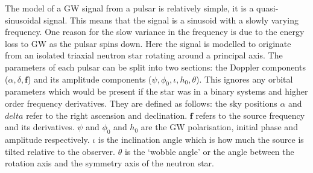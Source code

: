The model of a \gls{GW} signal from a pulsar is relatively simple, it is a quasi-sinusoidal signal. This means that the signal is a sinusoid with a slowly varying frequency. One reason for the slow variance in the frequency is due to the energy loss to \gls{GW} as the pulsar spins down.
Here the signal is modelled to originate from an isolated triaxial neutron star rotating around a principal axis. 
The parameters of each pulsar can be split into two sections: the Doppler components ($\alpha,\delta,{\bm f}$) and its amplitude components ($\psi,\phi_0, \iota, h_0, \theta$). This ignores any orbital parameters which would be present if the star was in a binary systems and higher order frequency derivatives.
They are defined as follows: the sky positions $\alpha$ and $delta$ refer to the right ascension and declination. 
${\bm f}$ refers to the source frequency and its derivatives. 
$\psi$ and $\phi_0$ and $h_0 $ are the \gls{GW} polarisation, initial phase and amplitude respectively. 
$\iota$ is the inclination angle which is how much the source is tilted relative to the observer. 
$\theta$ is the `wobble angle' or the angle between the rotation axis and the symmetry axis of the neutron star.

